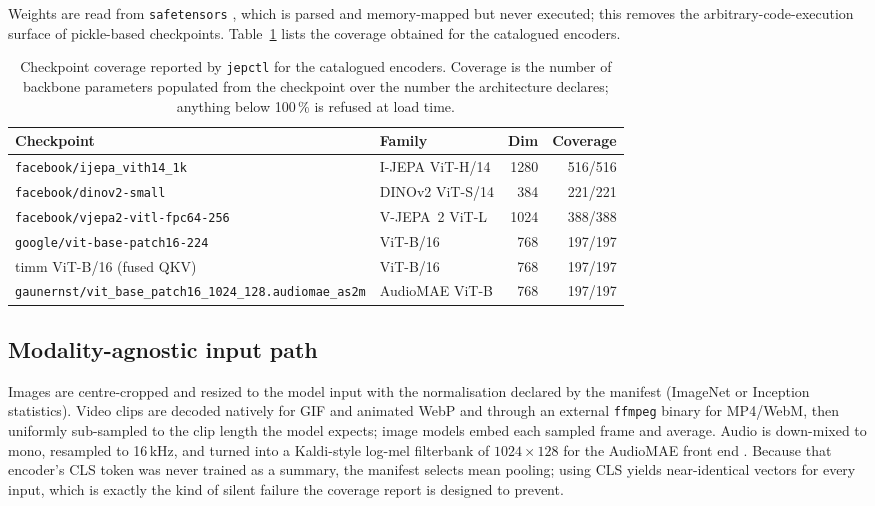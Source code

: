 \documentclass[11pt,onecolumn]{article}
\newcommand{\jepctl}{\texttt{jepctl}}
\newcommand{\code}[1]{\texttt{#1}}
\begin{document}
Weights are read from \code{safetensors} \cite{safetensors}, which is parsed and
memory-mapped but never executed; this removes the arbitrary-code-execution surface of
pickle-based checkpoints. Table~\ref{tab:weights} lists the coverage obtained for the
catalogued encoders.

\begin{table}[t]
\centering
\small
\begin{tabular}{llrr}
\toprule
Checkpoint & Family & Dim & Coverage \\
\midrule
\code{facebook/ijepa\_vith14\_1k}                      & I-JEPA ViT-H/14   & 1280 & 516/516 \\
\code{facebook/dinov2-small}                           & DINOv2 ViT-S/14   & 384  & 221/221 \\
\code{facebook/vjepa2-vitl-fpc64-256}                  & V-JEPA~2 ViT-L    & 1024 & 388/388 \\
\code{google/vit-base-patch16-224}                     & ViT-B/16          & 768  & 197/197 \\
timm ViT-B/16 (fused QKV)                              & ViT-B/16          & 768  & 197/197 \\
{\footnotesize\code{gaunernst/vit\_base\_patch16\_1024\_128.audiomae\_as2m}} & AudioMAE ViT-B & 768 & 197/197 \\
\bottomrule
\end{tabular}
\caption{Checkpoint coverage reported by \jepctl{} for the catalogued encoders. Coverage
is the number of backbone parameters populated from the checkpoint over the number the
architecture declares; anything below 100\,\% is refused at load time.}
\label{tab:weights}
\end{table}

\subsection{Modality-agnostic input path}

Images are centre-cropped and resized to the model input with the normalisation declared
by the manifest (ImageNet or Inception statistics). Video clips are decoded natively for
GIF and animated WebP and through an external \code{ffmpeg} binary for MP4/WebM, then
uniformly sub-sampled to the clip length the model expects; image models embed each
sampled frame and average. Audio is down-mixed to mono, resampled to 16\,kHz, and turned
into a Kaldi-style log-mel filterbank of $1024 \times 128$ for the AudioMAE front end
\cite{audiomae2022}. Because that encoder's CLS token was never trained as a summary, the
manifest selects mean pooling; using CLS yields near-identical vectors for every input,
which is exactly the kind of silent failure the coverage report is designed to prevent.
\end{document}
